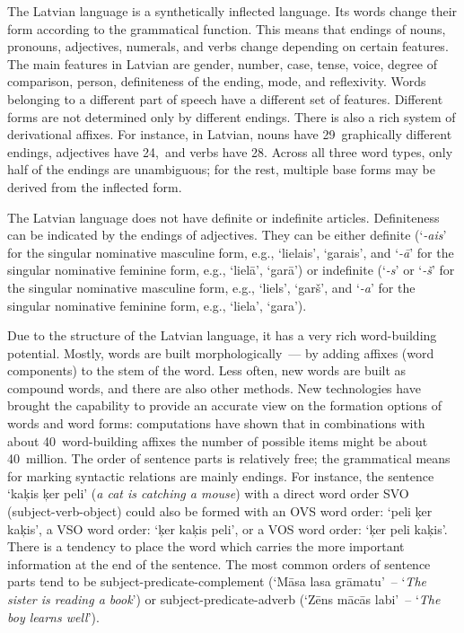 \begin{multicols}{2}

The Latvian language is a synthetically inflected language.
Its words change their form according to the grammatical function.
This means that endings of nouns, pronouns, adjectives, numerals, and verbs change depending on certain features.
The main features in Latvian are gender, number, case, tense, voice, degree of comparison, person, definiteness of the ending, mode, and reflexivity.
Words belonging to a different part of speech have a different set of features.
Different forms are not determined only by different endings.
There is also a rich system of derivational affixes.
For instance, in Latvian, nouns have 29~graphically different endings, adjectives have 24,~and verbs have 28.
Across all three word types, only half of the endings are unambiguous; for the rest, multiple base forms may be derived from the inflected form.

The Latvian language does not have definite or indefinite articles.
Definiteness can be indicated by the endings of adjectives.
They can be either definite (`\textit{-ais}' for the singular nominative masculine form, e.g., `lielais', `garais', and `\textit{-ā}' for the singular nominative feminine form, e.g., `lielā', `garā') or indefinite (`\textit{-s}' or `\textit{-š}' for the singular nominative masculine form, e.g., `liels', `garš', and `\textit{-a}' for the singular nominative feminine form, e.g., `liela', `gara').

Due to the structure of the Latvian language, it has a very rich word-building potential.
Mostly, words are built morphologically~--- by adding affixes (word components) to the stem of the word.
Less often, new words are built as compound words, and there are also other methods.
New technologies have brought the capability to provide an accurate view on the formation options of words and word forms: computations have shown that in combinations with about 40~word-building affixes the number of possible items might be about 40~million.
The order of sentence parts is relatively free; the grammatical means for marking syntactic relations are mainly endings.
For instance, the sentence `kaķis ķer peli' (\textit{a cat is catching a mouse}) with a direct word order SVO (subject-verb-object) could also be formed with an OVS word order: `peli ķer kaķis', a VSO word order: `ķer kaķis peli', or a VOS word order: `ķer peli kaķis'.
There is a tendency to place the word which carries the more important information at the end of the sentence.
The most common orders of sentence parts tend to be subject-predicate-complement (`Māsa lasa grāmatu'~-- `\textit{The sister is reading a book}') or subject-predicate-adverb (`Zēns mācās labi'~-- `\textit{The boy learns well}').


\end{multicols}
